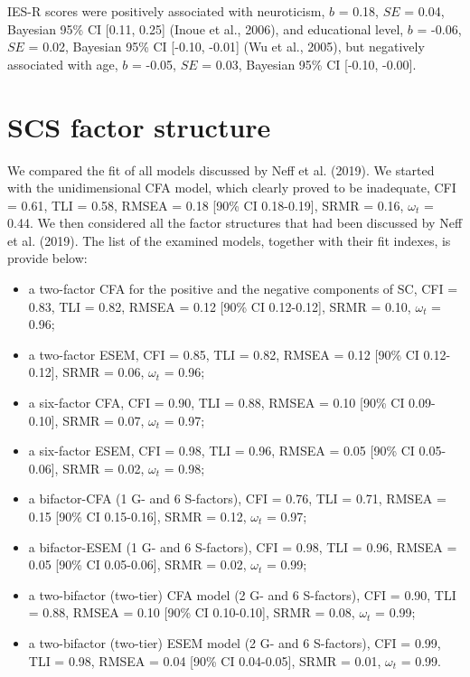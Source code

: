 \documentclass[aps,floatfix,prl]{revtex4}
\begin{document}
IES-R scores were positively associated with neuroticism, \(b\) = 0.18,
\(SE\) = 0.04, Bayesian 95\% CI {[}0.11, 0.25{]} (Inoue et al., 2006),
and educational level, \(b\) = -0.06, \(SE\) = 0.02, Bayesian 95\% CI
{[}-0.10, -0.01{]} (Wu et al., 2005), but negatively associated with
age, \(b\) = -0.05, \(SE\) = 0.03, Bayesian 95\% CI {[}-0.10, -0.00{]}.

\newpage

\section{SCS factor structure}\label{scs-factor-structure}

We compared the fit of all models discussed by Neff et al. (2019). We
started with the unidimensional CFA model, which clearly proved to be
inadequate, CFI = 0.61, TLI = 0.58, RMSEA = 0.18 {[}90\% CI
0.18-0.19{]}, SRMR = 0.16, \(\omega_t\) = 0.44. We then considered all
the factor structures that had been discussed by Neff et al. (2019). The
list of the examined models, together with their fit indexes, is provide
below:

\begin{itemize}
\item
  a two-factor CFA for the positive and the negative components of SC,
  CFI = 0.83, TLI = 0.82, RMSEA = 0.12 {[}90\% CI 0.12-0.12{]}, SRMR =
  0.10, \(\omega_t\) = 0.96;
\item
  a two-factor ESEM, CFI = 0.85, TLI = 0.82, RMSEA = 0.12 {[}90\% CI
  0.12-0.12{]}, SRMR = 0.06, \(\omega_t\) = 0.96;
\item
  a six-factor CFA, CFI = 0.90, TLI = 0.88, RMSEA = 0.10 {[}90\% CI
  0.09-0.10{]}, SRMR = 0.07, \(\omega_t\) = 0.97;
\item
  a six-factor ESEM, CFI = 0.98, TLI = 0.96, RMSEA = 0.05 {[}90\% CI
  0.05-0.06{]}, SRMR = 0.02, \(\omega_t\) = 0.98;
\item
  a bifactor-CFA (1 G- and 6 S-factors), CFI = 0.76, TLI = 0.71, RMSEA =
  0.15 {[}90\% CI 0.15-0.16{]}, SRMR = 0.12, \(\omega_t\) = 0.97;
\item
  a bifactor-ESEM (1 G- and 6 S-factors), CFI = 0.98, TLI = 0.96, RMSEA
  = 0.05 {[}90\% CI 0.05-0.06{]}, SRMR = 0.02, \(\omega_t\) = 0.99;
\item
  a two-bifactor (two-tier) CFA model (2 G- and 6 S-factors), CFI =
  0.90, TLI = 0.88, RMSEA = 0.10 {[}90\% CI 0.10-0.10{]}, SRMR = 0.08,
  \(\omega_t\) = 0.99;
\item
  a two-bifactor (two-tier) ESEM model (2 G- and 6 S-factors), CFI =
  0.99, TLI = 0.98, RMSEA = 0.04 {[}90\% CI 0.04-0.05{]}, SRMR = 0.01,
  \(\omega_t\) = 0.99.
\end{itemize}
\end{document}

